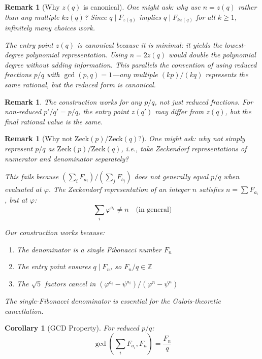 \documentclass[11pt]{article}
\newtheorem{corollary}[theorem]{Corollary}
\newtheorem{remark}[theorem]{Remark}
\begin{document}
\begin{remark}[Why $z(q)$ is canonical]
\label{rem:canonical}
One might ask: why use $n = z(q)$ rather than any multiple $kz(q)$? Since $q \mid F_{z(q)}$ implies $q \mid F_{kz(q)}$ for all $k \geq 1$, infinitely many choices work.

The entry point $z(q)$ is canonical because it is \emph{minimal}: it yields the lowest-degree polynomial representation. Using $n = 2z(q)$ would double the polynomial degree without adding information. This parallels the convention of using reduced fractions $p/q$ with $\gcd(p,q) = 1$---any multiple $(kp)/(kq)$ represents the same rational, but the reduced form is canonical.
\end{remark}

\begin{remark}
The construction works for any $p/q$, not just reduced fractions. For non-reduced $p'/q' = p/q$, the entry point $z(q')$ may differ from $z(q)$, but the final rational value is the same.
\end{remark}

\begin{remark}[Why not Zeck$(p)$/Zeck$(q)$?]
\label{rem:whynot}
One might ask: why not simply represent $p/q$ as $\mathrm{Zeck}(p)/\mathrm{Zeck}(q)$, i.e., take Zeckendorf representations of numerator and denominator separately?

This fails because $(\sum_i F_{a_i})/(\sum_j F_{b_j})$ does not generally equal $p/q$ when evaluated at $\varphi$. The Zeckendorf representation of an integer $n$ satisfies $n = \sum F_{a_i}$, but at $\varphi$:
\[
\sum_i \varphi^{a_i} \neq n \quad \text{(in general)}
\]

Our construction works because:
\begin{enumerate}
    \item The denominator is a \emph{single} Fibonacci number $F_n$
    \item The entry point ensures $q \mid F_n$, so $F_n/q \in \mathbb{Z}$
    \item The $\sqrt{5}$ factors cancel in $(\varphi^{a_i} - \psi^{a_i})/(\varphi^n - \psi^n)$
\end{enumerate}
The single-Fibonacci denominator is essential for the Galois-theoretic cancellation.
\end{remark}

\begin{corollary}[GCD Property]
For reduced $p/q$:
\[
\gcd\left(\sum_i F_{a_i}, F_n\right) = \frac{F_n}{q}
\]
\end{corollary}
\end{document}
